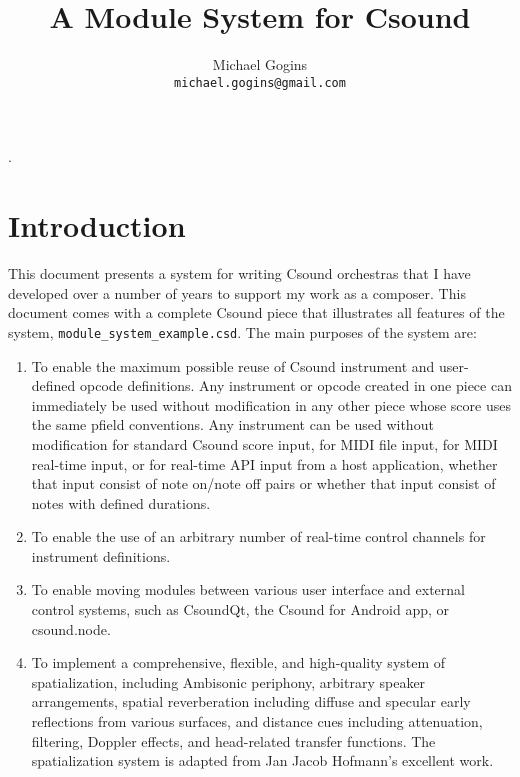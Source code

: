 \documentclass[12pt,letterpaper,onecolumn]{scrartcl}
\begin{document}
.
\title{A Module System for Csound}
\author{Michael Gogins \\ \texttt{michael.gogins@gmail.com}}
\maketitle

\section{Introduction}
\label{sec:Introduction}

This document presents a system for writing Csound orchestras that I have developed over a number of years to support my work as a composer. This document comes with a complete Csound piece that illustrates all features of the system, \texttt{module\_system\_example.csd}. The main purposes of the system are:

\begin{enumerate}
	\item To enable the maximum possible reuse of Csound instrument and user-defined opcode definitions. Any instrument or opcode created in one piece can immediately be used without modification in any other piece whose score uses the same pfield conventions. Any instrument can be used without modification for standard Csound score input, for MIDI file input, for MIDI real-time input, or for real-time API input from a host application, whether that input consist of note on/note off pairs or whether that input consist of notes with defined durations.
    \item To enable the use of an arbitrary number of real-time control channels for instrument definitions.
	\item To enable moving modules between various user interface and external control systems, such as CsoundQt, the Csound for Android app, or csound.node.
	\item To implement a comprehensive, flexible, and high-quality system of spatialization, including Ambisonic periphony, arbitrary speaker arrangements, spatial reverberation including diffuse and specular early reflections from various surfaces, and distance cues including attenuation, filtering, Doppler effects, and head-related transfer functions. The spatialization system is adapted from Jan Jacob Hofmann's excellent work. 
	
\end{enumerate}
\end{document}
